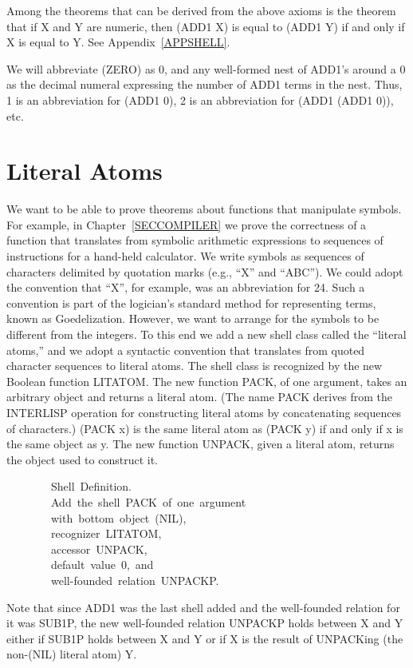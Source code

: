 \documentclass[11pt]{book}
\newenvironment{pubasis}{\begin{flushleft}\ttfamily\small}{\normalsize\rmfamily\end{flushleft}}
\newcommand{\pubdefaulttextsize}{\large}
\begin{document}
Among the theorems that can be derived from the above axioms is
the theorem that if X and Y are numeric, then (ADD1 X) is equal to (ADD1 Y)
if and only if X is equal to Y.  See Appendix~\ref{APPSHELL}.

We will abbreviate (ZERO) as 0, and any well-formed nest of ADD1's around a
0 as the decimal numeral expressing the number of ADD1 terms in the nest.
Thus, 1 is an abbreviation for (ADD1 0), 2 is an abbreviation
for (ADD1 (ADD1 0)), etc.
\section{Literal Atoms}
\pubdefaulttextsize
We want to be able to prove theorems about functions that
manipulate symbols.  For example, in Chapter~\ref{SECCOMPILER}
we prove the correctness of a function that
translates from symbolic arithmetic expressions to sequences of instructions
for a hand-held calculator.  We write symbols as sequences of characters
delimited by quotation marks  (e.g., ``X'' and ``ABC'').  We could
adopt the convention that ``X'', for example, was an abbreviation for 24.  Such
a convention is part of the logician's standard method for
representing terms, known as Goedelization.
However,
we want to arrange for the symbols to be different from the
integers.  To this end
we add a new shell class called the ``literal atoms,'' and we adopt
a syntactic convention that translates from quoted character sequences
to literal atoms.
The shell class is  recognized by the
new Boolean function LITATOM.  The new function PACK, of one argument, 
takes an arbitrary object and returns a literal atom.  (The name PACK
derives from the INTERLISP operation for constructing literal atoms by
concatenating sequences of characters.)  (PACK x) is the same
literal atom as (PACK y) if and only if x
is the same object as y.  The new function UNPACK, given a literal atom, returns the object
used to construct it.

\par\pagebreak[0]\hrulefill\nopagebreak\par
\begin{pubasis}
~~~~~~~~Shell~Definition.\\
~~~~~~~~Add~the~shell~PACK~of~one~argument\\
~~~~~~~~with~bottom~object~(NIL),\\
~~~~~~~~recognizer~LITATOM,\\
~~~~~~~~accessor~UNPACK,\\
~~~~~~~~default~value~0,~and\\
~~~~~~~~well-founded~relation~UNPACKP.\\
\end{pubasis}
\nopagebreak\par\hrulefill\nopagebreak\par
Note that since ADD1 was the last shell added
and the well-founded relation for it was SUB1P, the new well-founded relation
UNPACKP holds between X and Y  either if SUB1P holds between X and Y or
if X is the result of UNPACKing (the non-(NIL) literal atom) Y.
\end{document}
